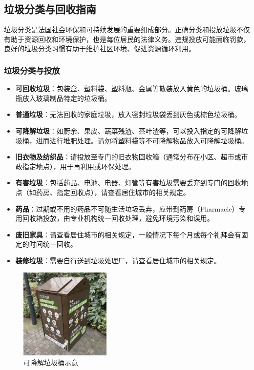 \subsection{垃圾分类与回收指南}

垃圾分类是法国社会环保和可持续发展的重要组成部分。正确分类和投放垃圾不仅有助于资源回收和环境保护，也是每位居民的法律义务。违规投放可能面临罚款，良好的垃圾分类习惯有助于维护社区环境、促进资源循环利用。

\subsubsection{垃圾分类与投放}
\begin{itemize}
    \item \textbf{可回收垃圾}：包装盒、塑料袋、塑料瓶、金属等散装放入黄色的垃圾桶。玻璃瓶放入玻璃制品特定的垃圾桶。
    \item \textbf{普通垃圾}：无法回收的家庭垃圾，放入密封垃圾袋丢到灰色或棕色垃圾桶。
    \item \textbf{可降解垃圾}：如厨余、果皮、蔬菜残渣、茶叶渣等，可以投入指定的可降解垃圾桶，进而进行堆肥处理。请勿将塑料袋等不可降解物品放入可降解垃圾桶。
    \item \textbf{旧衣物及纺织品}：请投放至专门的旧衣物回收箱（通常分布在小区、超市或市政指定地点），用于再利用或环保处理。
    \item \textbf{有害垃圾}：包括药品、电池、电器、灯管等有害垃圾需要丢弃到专门的回收地点（如药房、指定回收点），请查看居住城市的相关规定。
    \item \textbf{药品}：过期或不用的药品不可随生活垃圾丢弃，应带到药房（Pharmacie）专用回收箱投放，由专业机构统一回收处理，避免环境污染和误用。
    \item \textbf{废旧家具}：请查看居住城市的相关规定，一般情况下每个月或每个礼拜会有固定的时间统一回收。
    \item \textbf{装修垃圾}：需要自行送到垃圾处理厂，请查看居住城市的相关规定。
\end{itemize}

\begin{figure}[h]
    \centering
    \includegraphics[width=0.4\textwidth]{images/garbage_bin_biodegradable.jpg}
    \caption{可降解垃圾桶示意}
\end{figure}

